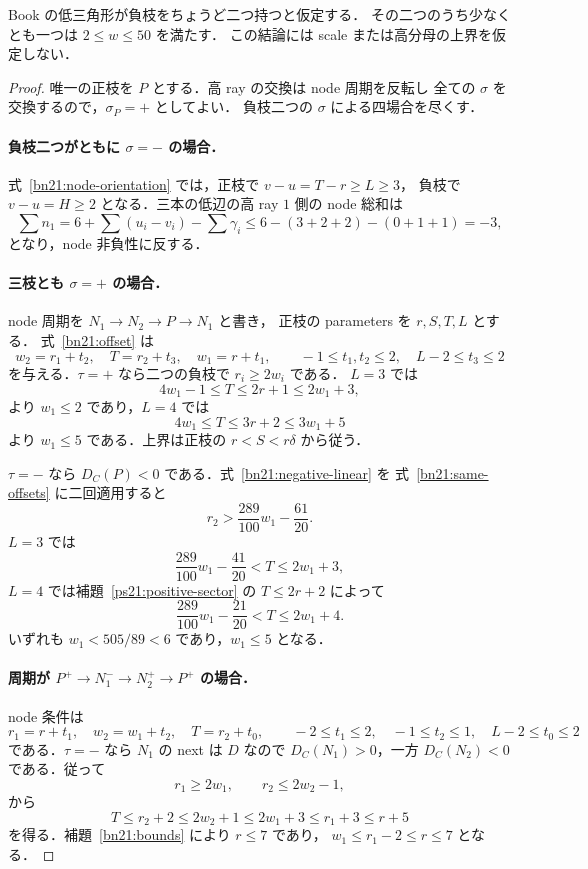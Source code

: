\begin{proposition}[二負枝に対する解析的な有限上界]
\label{bn21:analytic-finite}
Book の低三角形が負枝をちょうど二つ持つと仮定する．
その二つのうち少なくとも一つは $2\le w\le50$ を満たす．
この結論には scale または高分母の上界を仮定しない．
\end{proposition}

\begin{proof}
唯一の正枝を $P$ とする．高 ray の交換は node 周期を反転し
全ての $\sigma$ を交換するので，$\sigma_P=+$ としてよい．
負枝二つの $\sigma$ による四場合を尽くす．

\paragraph{負枝二つがともに $\sigma=-$ の場合．}
式~\eqref{bn21:node-orientation} では，正枝で $v-u=T-r\ge L\ge3$，
負枝で $v-u=H\ge2$ となる．三本の低辺の高 ray $1$ 側の node 総和は
\[
 \sum n_1=6+\sum(u_i-v_i)-\sum\gamma_i
 \le6-(3+2+2)-(0+1+1)=-3,
\]
となり，node 非負性に反する．

\paragraph{三枝とも $\sigma=+$ の場合．}
node 周期を $N_1\to N_2\to P\to N_1$ と書き，
正枝の parameters を $r,S,T,L$ とする．
式~\eqref{bn21:offset} は
\begin{equation}\label{bn21:same-offsets}
 w_2=r_1+t_2,\quad T=r_2+t_3,\quad w_1=r+t_1,
 \qquad
 -1\le t_1,t_2\le2,\quad L-2\le t_3\le2
\end{equation}
を与える．$\tau=+$ なら二つの負枝で $r_i\ge2w_i$ である．
$L=3$ では
\[
 4w_1-1\le T\le2r+1\le2w_1+3,
\]
より $w_1\le2$ であり，$L=4$ では
\[
 4w_1\le T\le3r+2\le3w_1+5
\]
より $w_1\le5$ である．上界は正枝の $r<S<r\delta$ から従う．

$\tau=-$ なら $D_C(P)<0$ である．式~\eqref{bn21:negative-linear} を
式~\eqref{bn21:same-offsets} に二回適用すると
\[
 r_2>\frac{289}{100}w_1-\frac{61}{20}.
\]
$L=3$ では
\[
 \frac{289}{100}w_1-\frac{41}{20}<T\le2w_1+3,
\]
$L=4$ では補題~\ref{ps21:positive-sector} の $T\le2r+2$ によって
\[
 \frac{289}{100}w_1-\frac{21}{20}<T\le2w_1+4.
\]
いずれも $w_1<505/89<6$ であり，$w_1\le5$ となる．

\paragraph{周期が $P^+\to N_1^-\to N_2^+\to P^+$ の場合．}
node 条件は
\begin{equation}\label{bn21:A-offsets}
 r_1=r+t_1,\quad w_2=w_1+t_2,\quad T=r_2+t_0,
 \qquad
 -2\le t_1\le2,\quad-1\le t_2\le1,\quad L-2\le t_0\le2
\end{equation}
である．$\tau=-$ なら $N_1$ の next は $D$ なので
$D_C(N_1)>0$，一方 $D_C(N_2)<0$ である．従って
\[
 r_1\ge2w_1,\qquad r_2\le2w_2-1,
\]
から
\[
 T\le r_2+2\le2w_2+1\le2w_1+3\le r_1+3\le r+5
\]
を得る．補題~\ref{bn21:bounds} により $r\le7$ であり，
$w_1\le r_1-2\le r\le7$ となる．


\end{proof}
